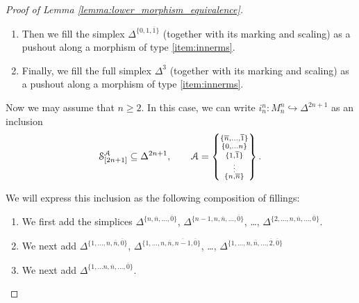 \documentclass[main.tex]{subfiles}
\begin{document}
\begin{proof}[Proof of Lemma \ref{lemma:lower_morphism_equivalence}]
\begin{enumerate}
    \item Then we fill the simplex $\Delta^{\{0,1,\overline{1}\}}$ (together with its marking and scaling) as a pushout along a morphism of type \ref{item:innerms}.

    \item Finally, we fill the full simplex $\Delta^{3}$ (together with its marking and scaling) as a pushout along a morphism of type \ref{item:innerms}.
  \end{enumerate}

  Now we may assume that $n \geq 2$. In this case, we can write $i^{n}_{n}\colon M^{n}_{n} \hookrightarrow \Delta^{2n+1}$ as an inclusion
  \begin{equation*}
    \S^{\mathcal{A}}_{[2n+1]} \subseteq \Delta^{2n+1},\qquad \mathcal{A} = \left\{ \substack{ \{\overline{n}, \ldots, \overline{1}\} \\ \{0, \ldots n\} \\ \{1, \overline{1}\} \\ \vdots \\ \{n, \overline{n}\} } \right\}.
  \end{equation*}


  We will express this inclusion as the following composition of fillings:
  \begin{enumerate}
    \item We first add the simplices $\Delta^{\{n, \overline{n}, \ldots, \overline{0}\}}$, $\Delta^{\{n-1, n, \overline{n}, \ldots, \overline{0}\}}$, \dots, $\Delta^{\{2, \ldots, n, \overline{n}, \ldots, \overline{0}\}}$.

    \item We next add $\Delta^{\{1, \ldots, n, \overline{n}, \overline{0}\}}$, $\Delta^{\{1, \ldots, n, \overline{n}, \overline{n-1}, \overline{0}\}}$, \dots, $\Delta^{\{1, \ldots, n, \overline{n}, \ldots, \overline{2}, \overline{0}\}}$

    \item We next add $\Delta^{\{1, \ldots n, \overline{n}, \ldots, \overline{0}\}}$.


\end{enumerate}
\end{proof}
\end{document}
